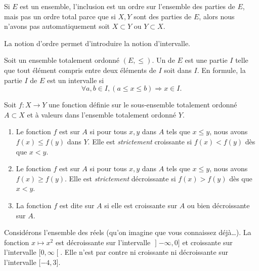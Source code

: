 \begin{example}
    Si \( E\) est un ensemble, l'inclusion est un ordre sur l'ensemble des parties de \( E\), mais pas un ordre total parce que si \( X,Y\) sont des parties de \( E\), alors nous n'avons pas automatiquement soit \( X\subset Y\) ou \( Y\subset X\).
\end{example}

La notion d'ordre permet d'introduire la notion d'intervalle.

\begin{definition}  \label{DefEYAooMYYTz}
    Soit un ensemble totalement ordonné \( (E,\leq)\). Un  de \( E\) est une partie \( I\) telle que tout élément compris entre deux éléments de \( I \) soit dans \( I \). En formule, la partie \( I \) de \( E\) est un intervalle si
    \[
      \forall a,b\in I,(a\leq x\leq b)\Rightarrow x\in I.
    \]
\end{definition}



\begin{definition} \label{FctCroissDecroiss_EnsemblesOrdonnes}
    Soit \( f\colon X \to Y \) une fonction définie sur le sous-ensemble totalement ordonné \( A \subset X \) et à valeurs dans l'ensemble totalement ordonné \( Y \).
    \begin{enumerate}
        \item
            Le fonction \( f\) est  sur \( A \) si pour tous \( x, y\) dans \( A \) tels que \( x \leq y \), nous avons \( f(x)\leq f(y)\) dans \( Y \). Elle est \emph{strictement} croissante si \( f(x)<f(y)\) dès que \( x<y\).
        \item
            Le fonction \( f\) est  sur \( A\) si pour tous \( x, y\) dans \( A \) tels que \( x \leq y \), nous avons \( f(x)\geq f(y)\). Elle est \emph{strictement} décroissante si \( f(x)>f(y)\) dès que \( x<y\).
        \item
            La fonction \( f\) est dite  sur \( A\) si elle est croissante sur \( A \) ou bien décroissante sur \( A\).
    \end{enumerate}
\end{definition}


\begin{example}
    Considérons l'ensemble des réels (qu'on imagine que vous connaissez déjà\dots{}). La fonction \( x\mapsto x^2\) est décroissante sur l'intervalle \( \mathopen] -\infty , 0 \mathclose]\) et croissante sur l'intervalle \( \mathopen[ 0 , \infty \mathclose[\). Elle n'est par contre ni croissante ni décroissante sur l'intervalle \( \mathopen[ -4 , 3 \mathclose]\).
\end{example}

